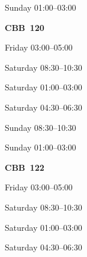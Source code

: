 \documentclass[11pt,oneside,letter]{article}
\begin{document}
\begin{center}
{\large Sunday 01:00--03:00}
\end{center}







\newpage

\begin{center}
{\LARGE {\bf CBB~120}}
\end{center}

\begin{center}
{\large Friday 03:00--05:00}
\end{center}

\begin{center}
{\large Saturday 08:30--10:30}
\end{center}


\begin{center}
{\large Saturday 01:00--03:00}
\end{center}


\begin{center}
{\large Saturday 04:30--06:30}
\end{center}


\begin{center}
{\large Sunday 08:30--10:30}
\end{center}


\begin{center}
{\large Sunday 01:00--03:00}
\end{center}



\newpage
\begin{center}
{\LARGE {\bf CBB~122}}
\end{center}

\begin{center}
{\large Friday 03:00--05:00}
\end{center}

\begin{center}
{\large Saturday 08:30--10:30}
\end{center}


\begin{center}
{\large Saturday 01:00--03:00}
\end{center}


\begin{center}
{\large Saturday 04:30--06:30}
\end{center}

\end{document}
